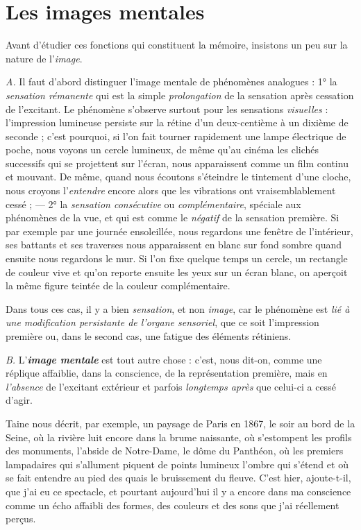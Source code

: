 \section{Les images mentales}%
Avant d’étudier ces fonctions qui
constituent la mémoire, insistons un peu sur la nature de l’{\it image}.

\vspace{0.24cm}
{\footnotesize 
{\it A.} Il faut d’abord distinguer l’image mentale de phénomènes analogues :
1° la \textsf{\textit {sensation rémanente}} qui est la simple {\it prolongation} de la sensation
après cessation de l’excitant. Le phénomène s'observe surtout pour les
sensations {\it visuelles} : l'impression lumineuse persiste sur la rétine d’un
deux-centième à un dixième de seconde ; c’est pourquoi, si l’on fait tourner
rapidement une lampe électrique de poche, nous voyons un cercle lumineux,
de même qu’au cinéma les clichés successifs qui se projettent sur l'écran,
nous apparaissent comme un film continu et mouvant. De même, quand
nous écoutons s’éteindre le tintement d’une cloche, nous croyons l'{\it entendre}
encore alors que les vibrations ont vraisemblablement cessé ; — 2° la \textsf{\textit {sensation
consécutive}} ou \textsf{\textit {complémentaire}}, spéciale aux phénomènes de la vue, et
qui est comme le {\it négatif} de la sensation première. Si par exemple par une
journée ensoleillée, nous regardons une fenêtre de l’intérieur, ses battants
et ses traverses nous apparaissent en blanc sur fond sombre quand ensuite
nous regardons le mur. Si l’on fixe quelque temps un cercle, un rectangle
de couleur vive et qu’on reporte ensuite les yeux sur un écran blanc, on
aperçoit la même figure teintée de la couleur complémentaire.

Dans tous ces cas, il y a bien {\it sensation}, et non {\it image}, car le phénomène
est {\it lié à une modification persistante de l'organe sensoriel}, que ce soit
l’impression première ou, dans le second cas, une fatigue des éléments rétiniens.}
\vspace{0.31cm}

{\it B.} L'\textbf{\textit {image mentale}} est tout autre chose : c’est, nous dit-on, comme
une réplique affaiblie, dans la conscience, de la représentation première,
mais en {\it l'absence} de l’excitant extérieur et parfois {\it longtemps
après} que celui-ci a cessé d’agir.

\vspace{0.24cm}
{\footnotesize 
Taine nous décrit, par exemple, un paysage de Paris en 1867, le soir au
bord de la Seine, où la rivière luit encore dans la brume naissante, où
s’estompent les profils des monuments, l’abside de Notre-Dame, le dôme du
Panthéon, où les premiers lampadaires qui s’allument piquent de points
lumineux l'ombre qui s'étend et où se fait entendre au pied des quais le
bruissement du fleuve. C’est hier, ajoute-t-il, que j'ai eu ce spectacle, et
pourtant aujourd’hui il y a encore dans ma conscience comme un écho
affaibli des formes, des couleurs et des sons que j'ai réellement perçus.}
\vspace{0.31cm}

